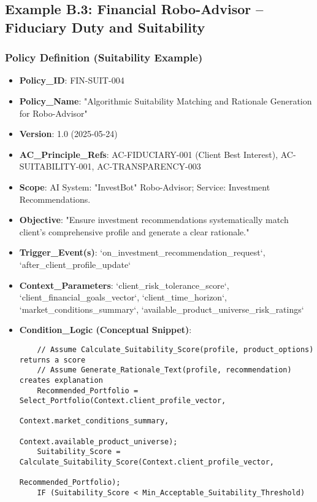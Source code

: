 \documentclass[sigconf,review,anonymous=false]{acmart} %
\begin{document}
\subsection{Example B.3: Financial Robo-Advisor – Fiduciary Duty and Suitability}
\label{app:policy_example_finance}
\subsubsection{Policy Definition (Suitability Example)}
\begin{itemize}
    \item \textbf{Policy\_ID}: FIN-SUIT-004
    \item \textbf{Policy\_Name}: "Algorithmic Suitability Matching and Rationale Generation for Robo-Advisor"
    \item \textbf{Version}: 1.0 (2025-05-24)
    \item \textbf{AC\_Principle\_Refs}: AC-FIDUCIARY-001 (Client Best Interest), AC-SUITABILITY-001, AC-TRANSPARENCY-003
    \item \textbf{Scope}: AI System: "InvestBot" Robo-Advisor; Service: Investment Recommendations.
    \item \textbf{Objective}: "Ensure investment recommendations systematically match client's comprehensive profile and generate a clear rationale."
    \item \textbf{Trigger\_Event(s)}: `on_investment_recommendation_request`, `after_client_profile_update`
    \item \textbf{Context\_Parameters}: `client_risk_tolerance_score`, `client_financial_goals_vector`, `client_time_horizon`, `market_conditions_summary`, `available_product_universe_risk_ratings`
    \item \textbf{Condition\_Logic (Conceptual Snippet)}:
    \begin{verbatim}
    // Assume Calculate_Suitability_Score(profile, product_options) returns a score
    // Assume Generate_Rationale_Text(profile, recommendation) creates explanation
    Recommended_Portfolio = Select_Portfolio(Context.client_profile_vector,
                                           Context.market_conditions_summary,
                                           Context.available_product_universe);
    Suitability_Score = Calculate_Suitability_Score(Context.client_profile_vector,
                                                  Recommended_Portfolio);
    IF (Suitability_Score < Min_Acceptable_Suitability_Threshold)

\end{verbatim}
\end{itemize}
\end{document}
